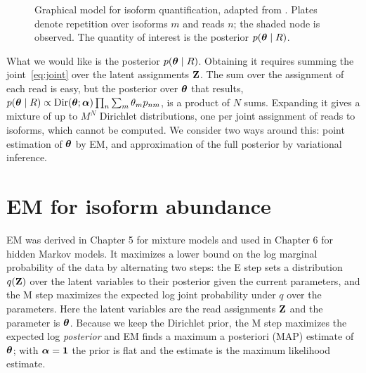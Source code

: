 \begin{figure}[!htbp]
  \centering
  \caption{Graphical model for isoform quantification, adapted from \citet{hensman2015}. Plates denote repetition over isoforms $m$ and reads $n$; the shaded node is observed. The quantity of interest is the posterior $p(\boldsymbol{\theta}\mid R)$.}
  \label{fig:graphical_model-10}
\end{figure}

What we would like is the posterior $p(\boldsymbol{\theta}\mid R)$. Obtaining it requires summing the joint~\eqref{eq:joint} over the latent assignments $\mathbf{Z}$. The sum over the assignment of each read is easy, but the posterior over $\boldsymbol{\theta}$ that results, $p(\boldsymbol{\theta}\mid R)\propto\operatorname{Dir}(\boldsymbol{\theta};\boldsymbol{\alpha})\prod_n\sum_m\theta_m p_{nm}$, is a product of $N$ sums. Expanding it gives a mixture of up to $M^N$ Dirichlet distributions, one per joint assignment of reads to isoforms, which cannot be computed. We consider two ways around this: point estimation of $\boldsymbol{\theta}$ by EM, and approximation of the full posterior by variational inference.

\section{EM for isoform abundance}
\label{sec:em-10}

EM was derived in Chapter 5 for mixture models and used in Chapter 6 for hidden Markov models. It maximizes a lower bound on the log marginal probability of the data by alternating two steps: the E step sets a distribution $q(\mathbf{Z})$ over the latent variables to their posterior given the current parameters, and the M step maximizes the expected log joint probability under $q$ over the parameters. Here the latent variables are the read assignments $\mathbf{Z}$ and the parameter is $\boldsymbol{\theta}$. Because we keep the Dirichlet prior, the M step maximizes the expected log \emph{posterior} and EM finds a maximum a posteriori (MAP) estimate of $\boldsymbol{\theta}$; with $\boldsymbol{\alpha}=\mathbf{1}$ the prior is flat and the estimate is the maximum likelihood estimate.

